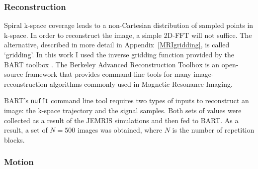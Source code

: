 % 
% 

\hfill

\subsubsection{Reconstruction}

Spiral k-space coverage leads to a non-Cartesian distribution of sampled points in k-space.
In order to reconstruct the image, a simple 2D-FFT will not suffice.
The alternative, described in more detail in Appendix~\ref{MRIgridding}, is called `gridding'.
In this work I used the inverse gridding function provided by the BART toolbox \cite{Lustig2016}.
The Berkeley Advanced Reconstruction Toolbox is an open-source framework that provides command-line tools for many image-reconstruction algorithms commonly used in Magnetic Resonance Imaging.

\hfill

BART's \texttt{nufft} command line tool requires two types of inputs to reconstruct an image: the k-space trajectory and the signal samples.
Both sets of values were collected as a result of the JEMRIS simulations and then fed to BART.
As a result, a set of $N = 500$ images was obtained, where $N$ is the number of repetition blocks.

\hfill

\subsubsection{Motion}
\label{method:motion}

